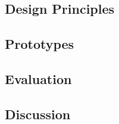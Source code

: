 \subsection{Design Principles}

\subsection{Prototypes}
\subsection{Evaluation}
\subsection{Discussion}

%
%
%
%
% 
% 
% 
% 
% 
% 

